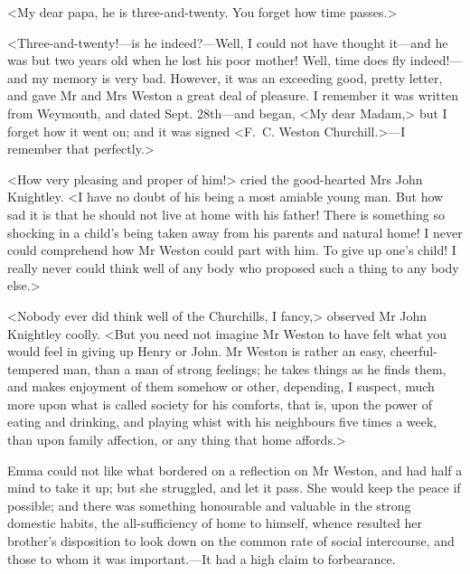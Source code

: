 <My dear papa, he is three-and-twenty. You forget how time passes.>

<Three-and-twenty!—is he indeed?—Well, I could not have thought it—and he was but two years old when he lost his poor mother! Well, time does fly indeed!—and my memory is very bad. However, it was an exceeding good, pretty letter, and gave Mr and Mrs Weston a great deal of pleasure. I remember it was written from Weymouth, and dated Sept. 28th—and began, <My dear Madam,> but I forget how it went on; and it was signed <F.~C. Weston Churchill.>—I remember that perfectly.>

<How very pleasing and proper of him!> cried the good-hearted Mrs John Knightley. <I have no doubt of his being a most amiable young man. But how sad it is that he should not live at home with his father! There is something so shocking in a child's being taken away from his parents and natural home! I never could comprehend how Mr Weston could part with him. To give up one's child! I really never could think well of any body who proposed such a thing to any body else.>

<Nobody ever did think well of the Churchills, I fancy,> observed Mr John Knightley coolly. <But you need not imagine Mr Weston to have felt what you would feel in giving up Henry or John. Mr Weston is rather an easy, cheerful-tempered man, than a man of strong feelings; he takes things as he finds them, and makes enjoyment of them somehow or other, depending, I suspect, much more upon what is called society for his comforts, that is, upon the power of eating and drinking, and playing whist with his neighbours five times a week, than upon family affection, or any thing that home affords.>

Emma could not like what bordered on a reflection on Mr Weston, and had half a mind to take it up; but she struggled, and let it pass. She would keep the peace if possible; and there was something honourable and valuable in the strong domestic habits, the all-sufficiency of home to himself, whence resulted her brother's disposition to look down on the common rate of social intercourse, and those to whom it was important.—It had a high claim to forbearance.
